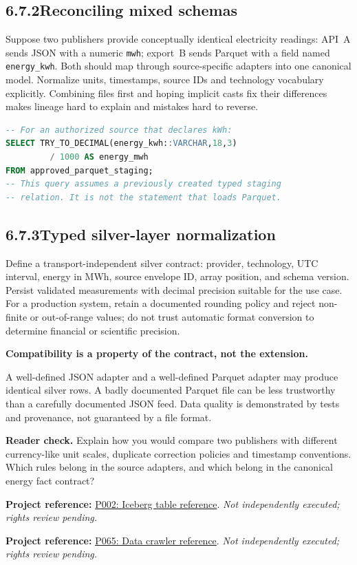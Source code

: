 \documentclass[11pt,twoside]{article}
\newcommand{\topic}[2]{\subsection*{#1\quad #2}}
\newcommand{\repo}[2]{\par\begingroup\fontsize{8.0}{9.6}\selectfont\sffamily\color{inkgray}\textbf{Project reference:} \href{#2}{#1}. \textit{Not independently executed; rights review pending.}\par\endgroup}
\begin{document}
\topic{6.7.2}{Reconciling mixed schemas}
Suppose two publishers provide conceptually identical electricity readings: API~A sends JSON with a numeric \texttt{mwh}; export~B sends Parquet with a field named \texttt{energy\_kwh}. Both should map through source-specific adapters into one canonical model. Normalize units, timestamps, source IDs and technology vocabulary explicitly. Combining files first and hoping implicit casts fix their differences makes lineage hard to explain and mistakes hard to reverse.

\begin{lstlisting}[language=SQL,caption={Illustrative typed mapping after a reviewed conversion.}]
-- For an authorized source that declares kWh:
SELECT TRY_TO_DECIMAL(energy_kwh::VARCHAR,18,3)
         / 1000 AS energy_mwh
FROM approved_parquet_staging;
-- This query assumes a previously created typed staging
-- relation. It is not the statement that loads Parquet.
\end{lstlisting}
\topic{6.7.3}{Typed silver-layer normalization}
Define a transport-independent silver contract: provider, technology, UTC interval, energy in MWh, source envelope ID, array position, and schema version. Persist validated measurements with decimal precision suitable for the use case. For a production system, retain a documented rounding policy and reject non-finite or out-of-range values; do not trust automatic format conversion to determine financial or scientific precision.

\begin{whitebox}\textbf{Compatibility is a property of the contract, not the extension.}\par
A well-defined JSON adapter and a well-defined Parquet adapter may produce identical silver rows. A badly documented Parquet file can be less trustworthy than a carefully documented JSON feed. Data quality is demonstrated by tests and provenance, not guaranteed by a file format.\end{whitebox}
\textbf{Reader check.} Explain how you would compare two publishers with different currency-like unit scales, duplicate correction policies and timestamp conventions. Which rules belong in the source adapters, and which belong in the canonical energy fact contract?
\repo{P002: Iceberg table reference}{https://github.com/Snowflake-Labs/sfguide-getting-started-with-iceberg-tables}
\repo{P065: Data crawler reference}{https://github.com/Snowflake-Labs/sfguide-data-crawler}
\newpage
\end{document}
